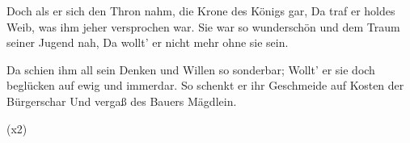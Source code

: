 \begin{guitar}
	 
	
	Doch als er sich den Thron nahm, die Krone des Königs gar,
	Da traf er holdes Weib, was ihm jeher versprochen war.
	Sie war so wunderschön und dem Traum seiner Jugend nah,
	Da wollt' er nicht mehr ohne sie sein.
	
	Da schien ihm all sein Denken und Willen so sonderbar;
	Wollt' er sie doch beglücken auf ewig und immerdar.
	So schenkt er ihr Geschmeide auf Kosten der Bürgerschar
	Und vergaß des Bauers Mägdlein.
	
	  (x2)
	
\end{guitar}

